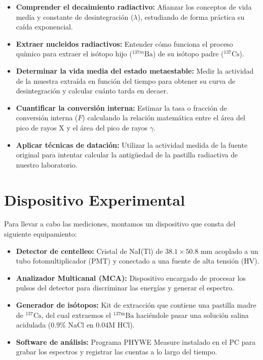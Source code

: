 \documentclass[9pt,a4paper,twocolumn,twoside]{rho-class/rho}
\begin{document}
\begin{itemize}
    \item \textbf{Comprender el decaimiento radiactivo:} Afianzar los conceptos de vida media y constante de desintegración ($\lambda$), estudiando de forma práctica su caída exponencial.
    \item \textbf{Extraer nucleidos radiactivos:} Entender cómo funciona el proceso químico para extraer el isótopo hijo ($^{137m}\text{Ba}$) de su isótopo padre ($^{137}\text{Cs}$).
    \item \textbf{Determinar la vida media del estado metaestable:} Medir la actividad de la muestra extraída en función del tiempo para obtener su curva de desintegración y calcular cuánto tarda en decaer.
    \item \textbf{Cuantificar la conversión interna:} Estimar la tasa o fracción de conversión interna ($F$) calculando la relación matemática entre el área del pico de rayos X y el área del pico de rayos $\gamma$.
    \item \textbf{Aplicar técnicas de datación:} Utilizar la actividad medida de la fuente original para intentar calcular la antigüedad de la pastilla radiactiva de nuestro laboratorio.
\end{itemize}

\section{Dispositivo Experimental}

Para llevar a cabo las mediciones, montamos un dispositivo que consta del siguiente equipamiento:

\begin{itemize}
    \item \textbf{Detector de centelleo:} Cristal de NaI(Tl) de $38.1 \times 50.8$ mm acoplado a un tubo fotomultiplicador (PMT) y conectado a una fuente de alta tensión (HV). 
    \item \textbf{Analizador Multicanal (MCA):} Dispositivo encargado de procesar los pulsos del detector para discriminar las energías y generar el espectro. 
    \item \textbf{Generador de isótopos:} Kit de extracción que contiene una pastilla madre de $^{137}\text{Cs}$, del cual extraemos el $^{137\text{m}}\text{Ba}$ haciéndole pasar una solución salina acidulada (0.9\% NaCl en 0.04M HCl). 
    \item \textbf{Software de análisis:} Programa PHYWE Measure instalado en el PC para grabar los espectros y registrar las cuentas a lo largo del tiempo. 
\end{itemize}
\end{document}
